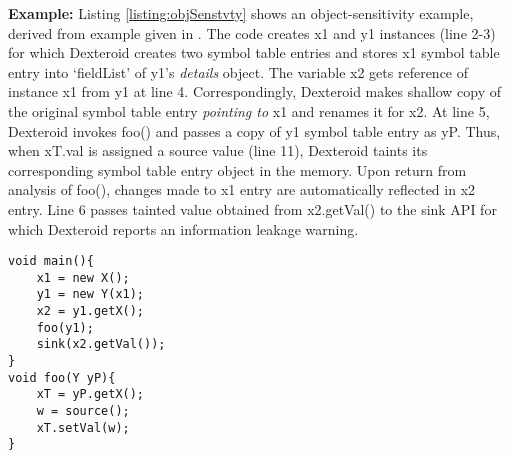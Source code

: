 \documentclass[10pt]{elsarticle}
\begin{document}
{\noindent \bf Example:} Listing \ref{listing:objSenstvty} shows an object-sensitivity example, derived from example given in \cite{FlowDroid}. The code creates {\ttfamily x1} and {\ttfamily y1} instances (line 2-3) for which Dexteroid creates two symbol table entries and stores {\ttfamily x1} symbol table entry into `fieldList' of {\ttfamily y1}'s \emph{details} object. The variable {\ttfamily x2} gets reference of instance {\ttfamily x1} from {\ttfamily y1} at line 4. Correspondingly, Dexteroid makes shallow copy of the original symbol table entry \emph{pointing to} {\ttfamily x1} and renames it for {\ttfamily x2}. At line 5, Dexteroid invokes {\ttfamily foo()} and passes a copy of {\ttfamily y1} symbol table entry as {\ttfamily yP}. Thus, when {\ttfamily xT.val} is assigned a source value (line 11), Dexteroid taints its corresponding symbol table entry object in the memory. Upon return from analysis of {\ttfamily foo()}, changes made to {\ttfamily x1} entry are automatically reflected in {\ttfamily x2} entry.  Line 6 passes tainted value obtained from {\ttfamily x2.getVal()} to the sink API for which Dexteroid reports an information leakage warning.



\begin{comment}
\begin{minipage}{0.25\linewidth}

\end{minipage}
\end{comment}

\noindent\begin{minipage}{7cm}  \begin{lstlisting}
void main(){
	x1 = new X(); 
	y1 = new Y(x1);
	x2 = y1.getX();
	foo(y1);
	sink(x2.getVal());
}
void foo(Y yP){
	xT = yP.getX();
	w = source();
	xT.setVal(w);
}
\end{lstlisting}
\end{minipage} 
\end{document}
